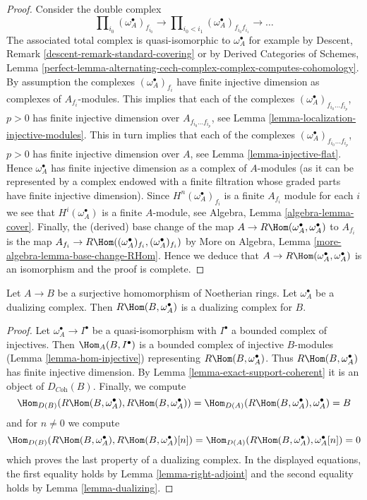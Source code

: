 \begin{proof}
Consider the double complex
$$
\prod\nolimits_{i_0} (\omega_A^\bullet)_{f_{i_0}}
\to
\prod\nolimits_{i_0 < i_1} (\omega_A^\bullet)_{f_{i_0}f_{i_1}}
\to \ldots
$$
The associated total complex is quasi-isomorphic to $\omega_A^\bullet$
for example by Descent, Remark \ref{descent-remark-standard-covering}
or by
Derived Categories of Schemes, Lemma
\ref{perfect-lemma-alternating-cech-complex-complex-computes-cohomology}.
By assumption the complexes $(\omega_A^\bullet)_{f_i}$ have
finite injective dimension as complexes of $A_{f_i}$-modules.
This implies that each of the complexes
$(\omega_A^\bullet)_{f_{i_0} \ldots f_{i_p}}$, $p > 0$ has
finite injective dimension over $A_{f_{i_0} \ldots f_{i_p}}$,
see Lemma \ref{lemma-localization-injective-modules}.
This in turn implies that each of the complexes
$(\omega_A^\bullet)_{f_{i_0} \ldots f_{i_p}}$, $p > 0$ has
finite injective dimension over $A$, see
Lemma \ref{lemma-injective-flat}. Hence $\omega_A^\bullet$
has finite injective dimension as a complex of $A$-modules
(as it can be represented by a complex endowed with
a finite filtration whose graded parts have finite injective
dimension). Since $H^n(\omega_A^\bullet)_{f_i}$ is a finite
$A_{f_i}$ module for each $i$ we see that $H^i(\omega_A^\bullet)$
is a finite $A$-module, see Algebra, Lemma \ref{algebra-lemma-cover}.
Finally, the (derived) base change of the map
$A \to R\Hom(\omega_A^\bullet, \omega_A^\bullet)$ to $A_{f_i}$
is the map
$A_{f_i} \to R\Hom((\omega_A^\bullet)_{f_i}, (\omega_A^\bullet)_{f_i})$ by
More on Algebra, Lemma \ref{more-algebra-lemma-base-change-RHom}.
Hence we deduce that
$A \to R\Hom(\omega_A^\bullet, \omega_A^\bullet)$
is an isomorphism and the proof is complete.
\end{proof}

\begin{lemma}
\label{lemma-dualizing-quotient}
Let $A \to B$ be a surjective homomorphism of Noetherian rings.
Let $\omega_A^\bullet$ be a dualizing complex.
Then $R\Hom(B, \omega_A^\bullet)$ is a dualizing complex for $B$.
\end{lemma}

\begin{proof}
Let $\omega_A^\bullet \to I^\bullet$ be a quasi-isomorphism
with $I^\bullet$ a bounded complex of injectives.
Then $\Hom_A(B, I^\bullet)$ is a bounded complex of injective
$B$-modules (Lemma \ref{lemma-hom-injective}) representing
$R\Hom(B, \omega_A^\bullet)$.
Thus $R\Hom(B, \omega_A^\bullet)$ has finite injective dimension.
By Lemma \ref{lemma-exact-support-coherent} it is an object of
$D_{\textit{Coh}}(B)$. Finally, we compute
$$
\Hom_{D(B)}(R\Hom(B, \omega_A^\bullet), R\Hom(B, \omega_A^\bullet)) =
\Hom_{D(A)}(R\Hom(B, \omega_A^\bullet), \omega_A^\bullet) = B
$$
and for $n \not = 0$ we compute
$$
\Hom_{D(B)}(R\Hom(B, \omega_A^\bullet), R\Hom(B, \omega_A^\bullet)[n]) =
\Hom_{D(A)}(R\Hom(B, \omega_A^\bullet), \omega_A^\bullet[n]) = 0
$$
which proves the last property of a dualizing complex.
In the displayed equations, the first
equality holds by Lemma \ref{lemma-right-adjoint}
and the second equality holds by Lemma \ref{lemma-dualizing}.
\end{proof}

